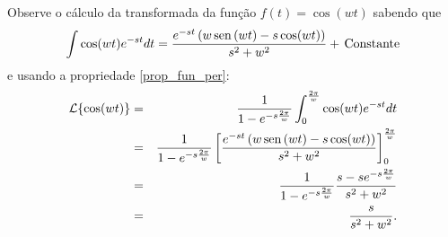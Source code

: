 \begin{ex}Observe o cálculo da transformada da função $f(t)=\cos(wt)$ sabendo que
\begin{equation}
\int \cos(wt)e^{-st}dt=\frac{e^{-st}\left(w\sen(wt)-s\cos(wt)\right)}{s^2+w^2}+\ \!\hbox{Constante}
\end{equation}
e usando a propriedade \ref{prop_fun_per}:
\begin{eqnarray*} 
\mathcal{L}\{\cos(wt)\}&=&\frac{1}{1-e^{-s\frac{2\pi }{w}}}\int_0^{\frac{2\pi }{w}}\cos(wt)e^{-st}dt\\
&=&\frac{1}{1-e^{-s\frac{2\pi }{w}}}\left[\frac{e^{-st}\left(w\operatorname{sen}\,(wt)-s\cos(wt)\right)}{s^2+w^2}\right]_0^{\frac{2\pi }{w}}\\
&=&\frac{1}{1-e^{-s\frac{2\pi }{w}}}\frac{s-se^{-s\frac{2\pi }{w}}}{s^2+w^2}\\
&=&\frac{s}{s^2+w^2}.
\end{eqnarray*}
\end{ex}
